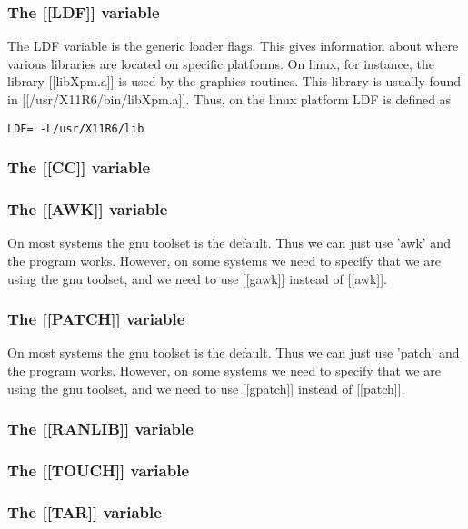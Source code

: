 \documentclass{article}
\begin{document}
\subsubsection{The [[LDF]] variable }

The LDF variable is the generic loader flags. This gives information
about where various libraries are located on specific platforms. On
linux, for instance, the library [[libXpm.a]] is used by the graphics
routines. This library is usually found in [[/usr/X11R6/bin/libXpm.a]].
Thus, on the linux platform LDF is defined as
\begin{verbatim}
LDF= -L/usr/X11R6/lib
\end{verbatim}

\subsubsection{The [[CC]] variable }

\subsubsection{The [[AWK]] variable }

On most systems the gnu toolset is the default. Thus we can just use
'awk' and the program works. However, on some systems we need to
specify that we are using the gnu toolset, and we need to use
[[gawk]] instead of [[awk]].

\subsubsection{The [[PATCH]] variable }

On most systems the gnu toolset is the default. Thus we can just use
'patch' and the program works. However, on some systems we need to
specify that we are using the gnu toolset, and we need to use
[[gpatch]] instead of [[patch]].

\subsubsection{The [[RANLIB]] variable }

\subsubsection{The [[TOUCH]] variable }

\subsubsection{The [[TAR]] variable }
\end{document}
